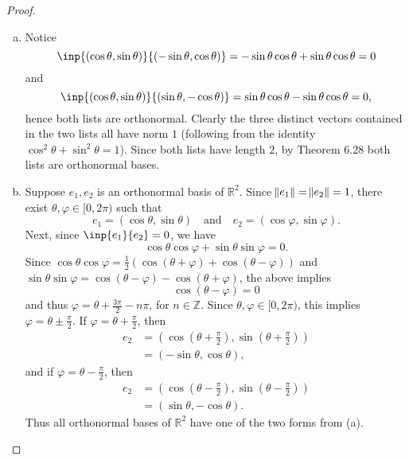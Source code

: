 \documentclass{extarticle}
\newcommand{\Z}{\mathbb{Z}}
\newcommand{\R}{\mathbb{R}}
\begin{document}
\begin{proof}
\begin{enumerate}[(a)]
\item Notice
\begin{equation*}
\inp{(\cos\theta, \sin\theta)}{(-\sin\theta,\cos\theta)} = -\sin\theta\cos\theta + \sin\theta\cos\theta = 0
\end{equation*}
and
\begin{equation*}
\inp{(\cos\theta, \sin\theta)}{(\sin\theta,-\cos\theta)} = \sin\theta\cos\theta - \sin\theta\cos\theta = 0,
\end{equation*}
hence both lists are orthonormal.  Clearly the three distinct vectors contained in the two lists all have norm $1$ (following from the identity $\cos^2\theta + \sin^2\theta = 1$).  Since both lists have length $2$, by  Theorem 6.28 both lists are orthonormal bases.
\item Suppose $e_1,e_2$ is an orthonormal basis of $\R^2$.  Since $\norm{e_1} = \norm{e_2} = 1$, there exist $\theta, \varphi \in [0, 2\pi)$ such that 
\begin{equation*}
e_1 = (\cos\theta, \sin\theta) \quad\text{and}\quad e_2 = (\cos\varphi, \sin\varphi).
\end{equation*}
Next, since $\inp{e_1}{e_2} = 0$, we have
\begin{equation*}
\cos\theta\cos\varphi + \sin\theta\sin\varphi = 0.
\end{equation*}
Since $\cos\theta\cos\varphi = \frac{1}{2}(\cos(\theta + \varphi) + \cos(\theta - \varphi))$ and $\sin\theta\sin\varphi = \cos(\theta - \varphi) - \cos(\theta + \varphi)$, the above implies
\begin{equation*}
\cos(\theta - \varphi) = 0
\end{equation*}
and thus $\varphi = \theta + \frac{3\pi}{2} - n\pi$, for $n \in \Z$.  Since $\theta,\varphi\in[0, 2\pi)$, this implies $\varphi = \theta \pm \frac{\pi}{2}$.  If $\varphi = \theta + \frac{\pi}{2}$, then
\begin{align*}
e_2 &= \left(\cos\left(\theta + \frac{\pi}{2}\right), \sin\left(\theta + \frac{\pi}{2}\right)\right)\\
&= (-\sin\theta, \cos\theta),
\end{align*} 
and if $\varphi = \theta - \frac{\pi}{2}$, then
\begin{align*}
e_2 &= \left(\cos\left(\theta - \frac{\pi}{2}\right), \sin\left(\theta - \frac{\pi}{2}\right)\right)\\
&= (\sin\theta, -\cos\theta).
\end{align*}
Thus all orthonormal bases of $\R^2$ have one of the two forms from (a).
\end{enumerate}
\end{proof}
\end{document}

